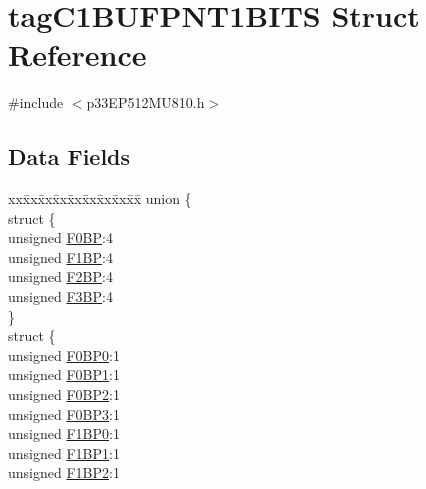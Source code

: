 \hypertarget{structtag_c1_b_u_f_p_n_t1_b_i_t_s}{}\section{tag\+C1\+B\+U\+F\+P\+N\+T1\+B\+I\+TS Struct Reference}
\label{structtag_c1_b_u_f_p_n_t1_b_i_t_s}


{\ttfamily \#include $<$p33\+E\+P512\+M\+U810.\+h$>$}

\subsection*{Data Fields}
\begin{DoxyCompactItemize}
\item 
\begin{tabbing}
xx\=xx\=xx\=xx\=xx\=xx\=xx\=xx\=xx\=\kill
union \{\\
\>struct \{\\
\>\>unsigned \hyperlink{structtag_c1_b_u_f_p_n_t1_b_i_t_s_aa9c66c9f4bc4c729ef4f1f87efdeeb88}{F0BP}:4\\
\>\>unsigned \hyperlink{structtag_c1_b_u_f_p_n_t1_b_i_t_s_a13eaa4600b1376f2a013eca6282df97c}{F1BP}:4\\
\>\>unsigned \hyperlink{structtag_c1_b_u_f_p_n_t1_b_i_t_s_a3b2abfa620b4985fea49be15109bf36e}{F2BP}:4\\
\>\>unsigned \hyperlink{structtag_c1_b_u_f_p_n_t1_b_i_t_s_a3c19570796ab9da4c0accd81535e312f}{F3BP}:4\\
\>\} \\
\>struct \{\\
\>\>unsigned \hyperlink{structtag_c1_b_u_f_p_n_t1_b_i_t_s_a637f43f277c54677f408e4dbad68ec7b}{F0BP0}:1\\
\>\>unsigned \hyperlink{structtag_c1_b_u_f_p_n_t1_b_i_t_s_ad970635ce8028c5e09388a003eb8dd49}{F0BP1}:1\\
\>\>unsigned \hyperlink{structtag_c1_b_u_f_p_n_t1_b_i_t_s_a51bf68bc4cf8d68b9ffeffcf232a59a5}{F0BP2}:1\\
\>\>unsigned \hyperlink{structtag_c1_b_u_f_p_n_t1_b_i_t_s_a9e5dc1f1e8846963163f31aba947e9f6}{F0BP3}:1\\
\>\>unsigned \hyperlink{structtag_c1_b_u_f_p_n_t1_b_i_t_s_a114ec7f79a7874cc05755efc870fea6d}{F1BP0}:1\\
\>\>unsigned \hyperlink{structtag_c1_b_u_f_p_n_t1_b_i_t_s_ac434c261b0b9825663072e9f28737a49}{F1BP1}:1\\
\>\>unsigned \hyperlink{structtag_c1_b_u_f_p_n_t1_b_i_t_s_a1790c169dde2a4b27d94be25f133c4bf}{F1BP2}:1\\

\end{tabbing}
\end{DoxyCompactItemize}
